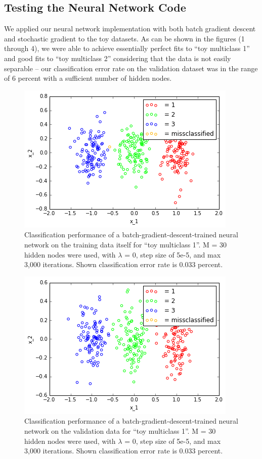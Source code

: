 \documentclass[10pt]{article}
\begin{document}
\subsection*{Testing the Neural Network Code}


We applied our neural network implementation with both batch gradient descent and stochastic gradient to the toy datasets.  As can be shown in the figures (1 through 4), we were able to achieve essentially perfect fits to ``toy multiclass 1'' and good fits to ``toy multiclass 2'' considering that the data is not easily separable -- our classification error rate on the validation dataset was in the range of 6 percent with a sufficient number of hidden nodes.  

\begin{figure}
\centering
\includegraphics[scale=0.5]{toy1_train.png}
\caption{Classification performance of a batch-gradient-descent-trained neural network on the training data itself for ``toy multiclass 1''.  M = 30 hidden nodes were used, with $\lambda$ = 0, step size of 5e-5, and max 3,000 iterations. Shown classification error rate is 0.033 percent.}
\label{toy1_train}
\end{figure}
%
\begin{figure}
\centering
\includegraphics[scale=0.5]{toy1_val.png}
\caption{Classification performance of a batch-gradient-descent-trained neural network on the validation data for ``toy multiclass 1''.  M = 30 hidden nodes were used, with $\lambda$ = 0, step size of 5e-5, and max 3,000 iterations. Shown classification error rate is 0.033 percent.}
\label{toy1_val}
\end{figure}
\end{document}
